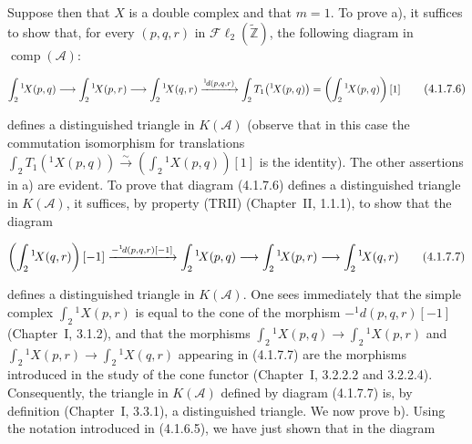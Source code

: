 \clearpage
{}%
\begingroup\small\setlength{\parskip}{0pt}\setlength{\emergencystretch}{1.5em}
\setlength{\abovedisplayskip}{4pt plus 2pt minus 2pt}%
\setlength{\belowdisplayskip}{4pt plus 2pt minus 2pt}%

Suppose then that $X$ is a double complex and that $m=1$. To prove a), it
suffices to show that, for every $(p,q,r)$ in
$\mathcal{F}\ell_2(\widetilde{\mathbb Z})$, the following diagram in
$\operatorname{comp}(\mathcal A)$:

\begin{equation}
\resizebox{0.98\linewidth}{!}{$
\displaystyle
\int_2{}^{1}\!X(p,q)\longrightarrow
\int_2{}^{1}\!X(p,r)\longrightarrow
\int_2{}^{1}\!X(q,r)
\xrightarrow{{}^{1}\!d(p,q,r)}
\int_2T_1\bigl({}^{1}\!X(p,q)\bigr)
=\left(\int_2{}^{1}\!X(p,q)\right)[1]
$}
\tag{4.1.7.6}
\end{equation}

defines a distinguished triangle in $K(\mathcal A)$ (observe that in this
case the commutation isomorphism for translations
$\int_2T_1({}^{1}\!X(p,q))\xrightarrow{\sim}
(\int_2{}^{1}\!X(p,q))[1]$ is the identity). The other assertions in a)
are evident. To prove that diagram (4.1.7.6) defines a distinguished
triangle in $K(\mathcal A)$, it suffices, by property (TRII) (Chapter~II,
1.1.1), to show that the diagram

\begin{equation}
\resizebox{0.96\linewidth}{!}{$
\displaystyle
\left(\int_2{}^{1}\!X(q,r)\right)[-1]
\xrightarrow{-{}^{1}\!d(p,q,r)[-1]}
\int_2{}^{1}\!X(p,q)\longrightarrow
\int_2{}^{1}\!X(p,r)\longrightarrow
\int_2{}^{1}\!X(q,r)
$}
\tag{4.1.7.7}
\end{equation}

defines a distinguished triangle in $K(\mathcal A)$. One sees immediately
that the simple complex $\int_2{}^{1}\!X(p,r)$ is equal to the cone of the
morphism $-{}^{1}\!d(p,q,r)[-1]$ (Chapter~I, 3.1.2), and that the
morphisms
$\int_2{}^{1}\!X(p,q)\longrightarrow\int_2{}^{1}\!X(p,r)$ and
$\int_2{}^{1}\!X(p,r)\longrightarrow\int_2{}^{1}\!X(q,r)$ appearing in
(4.1.7.7) are the morphisms introduced in the study of the cone functor
(Chapter~I, 3.2.2.2 and 3.2.2.4). Consequently, the triangle in
$K(\mathcal A)$ defined by diagram (4.1.7.7) is, by definition
(Chapter~I, 3.3.1), a distinguished triangle. We now prove b). Using the
notation introduced in (4.1.6.5), we have just shown that in the diagram

